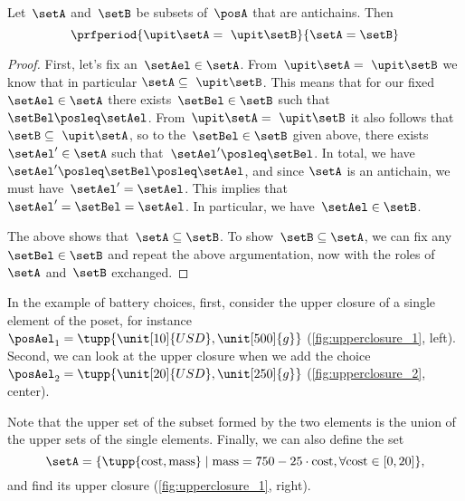 \begin{lemma}
    \label{lem:up-cl-inj-antichains}
    Let~$\setA$ and~$\setB$ be subsets of~$\posA$ that are antichains.
    Then
    \begin{equation*}
        \prfperiod{\upit  \setA = \ \upit  \setB}{\setA = \setB}
    \end{equation*}
\end{lemma}

\begin{proof}
    First, let's fix an~$\setAel \in \setA$.
    From~$\upit  \setA = \ \upit  \setB$ we know that in particular $\setA \subseteq \ \upit  \setB$.
    This means that for our fixed~$\setAel \in \setA$ there exists~$\setBel \in \setB$ such that~$\setBel \posleq \setAel$.
    From~$\upit \setA = \ \upit  \setB$ it also follows that~$\setB \subseteq \ \upit  \setA$, so to the~$\setBel \in \setB$ given above, there exists~$\setAel' \in \setA$ such that~$\setAel' \posleq \setBel$.
    In total, we have~$\setAel' \posleq \setBel \posleq \setAel$, and since $\setA$ is an antichain, we must have~$\setAel' = \setAel$.
    This implies that~$\setAel' = \setBel = \setAel$.
    In particular, we have~$\setAel \in \setB$.

    The above shows that~$\setA \subseteq \setB$.
    To show~$\setB \subseteq \setA$, we can fix any~$\setBel \in \setB$ and repeat the above argumentation, now with the roles of~$\setA$ and~$\setB$ exchanged.
\end{proof}

In the example of battery choices, first, consider the upper closure of a single element of the poset, for instance~$\posAel_1=\tupp{\unit[10]{USD},\unit[500]{g}}$ (\cref{fig:upperclosure_1}, left).
Second, we can look at the upper closure when we add the choice~$\posAel_2=\tupp{\unit[20]{USD},\unit[250]{g}}$ (\cref{fig:upperclosure_2}, center).

\begin{figure*}
    \centering
    \caption{The upper closure of a set of pizza recipes.}
    \label{fig:upperclosure_2}
\end{figure*}

Note that the upper set of the subset formed by the two elements is the union of the upper sets of the single elements.
% 
Finally, we can also define the set
% 
\begin{equation}
    \setA=\{
    \tupp{\text{cost},\text{mass}}\mid \text{mass}=750-25\cdot \text{cost},
    \forall \text{cost} \in [0,20]
    \},
\end{equation}
% 
and find its upper closure (\cref{fig:upperclosure_1}, right).
% 
\begin{figure*}[h!]
    \centering
     \hspace{0.1cm}
     \hspace{0.1cm}
    \caption{Example of uppler closure for different sets of battery choices. }
    \label{fig:upperclosure_1}
\end{figure*}

